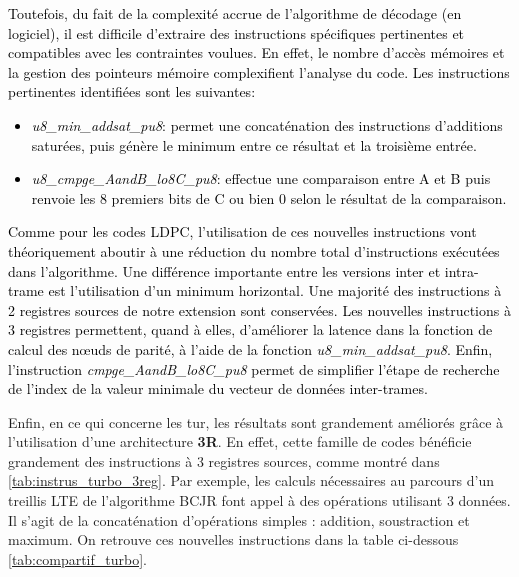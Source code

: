 \documentclass[../main.tex]{subfiles}
\begin{document}
\textcolor{black}{Toutefois, du fait de la complexité accrue de l'algorithme de décodage (en logiciel), il est difficile d'extraire des instructions spécifiques pertinentes et compatibles avec les contraintes voulues. 
En effet, le nombre d'accès mémoires et la gestion des pointeurs mémoire complexifient l'analyse du code.
Les instructions pertinentes identifiées sont les suivantes: 
\begin{itemize}
    \item \textit{u8\_min\_addsat\_pu8}: permet une concaténation des instructions d'additions saturées, puis génère le minimum entre ce résultat et la troisième entrée.
    \item \textit{u8\_cmpge\_AandB\_lo8C\_pu8}: effectue une comparaison entre A et B puis renvoie les 8 premiers bits de C ou bien 0 selon le résultat de la comparaison. 
\end{itemize}
Comme pour les codes LDPC, l'utilisation de ces nouvelles instructions vont théoriquement aboutir à une réduction du nombre total d'instructions exécutées dans l'algorithme.
Une différence importante entre les versions inter et intra-trame est l'utilisation d'un minimum horizontal.
Une majorité des instructions à 2 registres sources de notre extension sont conservées.
Les nouvelles instructions à 3 registres permettent, quand à elles, d'améliorer la latence dans la fonction de calcul des nœuds de parité, à l'aide de la fonction \textit{u8\_min\_addsat\_pu8}.
Enfin, l'instruction \textit{cmpge\_AandB\_lo8C\_pu8} permet de simplifier l'étape de recherche de l'index de la valeur minimale du vecteur de données inter-trames.\\ }



Enfin, en ce qui concerne les \acrlong{tur}, les résultats sont grandement améliorés grâce à l'utilisation d'une architecture \textbf{3R}.
En effet, cette famille de codes bénéficie grandement des instructions à 3 registres sources, comme montré dans \ref{tab:instrus_turbo_3reg}.
Par exemple, les calculs nécessaires au parcours d'un treillis LTE de l'algorithme BCJR font appel à des opérations utilisant 3 données.
Il s'agit de la concaténation d'opérations simples : addition, soustraction et maximum.
On retrouve ces nouvelles instructions dans la table ci-dessous \ref{tab:compartif_turbo}.
\end{document}

